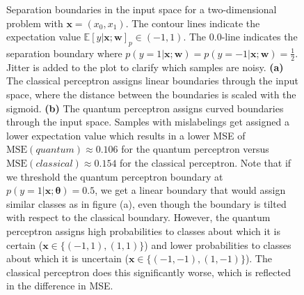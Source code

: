 \begin{figure}[htb!]
    \caption{Separation boundaries in the input space for a two-dimensional problem with $\mathbf{x}=(x_0, x_1)$. The contour lines indicate the expectation value $\mathbb{E}[y|\mathbf{x};\mathbf{w}]_p\in(-1,1)$. The $0.0$-line indicates the separation boundary where $p(y=1|\mathbf{x};\mathbf{w}) = p(y=-1|\mathbf{x};\mathbf{w})=\frac{1}{2}$. Jitter is added to the plot to clarify which samples are noisy. \textbf{(a)} The classical perceptron assigns linear boundaries through the input space, where the distance between the boundaries is scaled with the sigmoid. \textbf{(b)} The quantum perceptron assigns curved boundaries through the input space. Samples with mislabelings get assigned a lower expectation value which results in a lower MSE of $\text{MSE}(quantum) \approx 0.106$ for the quantum perceptron versus $\text{MSE}(classical) \approx 0.154$ for the classical perceptron. Note that if we threshold the quantum perceptron boundary at $p(y=1|\mathbf{x}; \bm{\theta}) = 0.5$, we get a linear boundary that would assign similar classes as in figure (a), even though the boundary is tilted with respect to the classical boundary. However, the quantum perceptron assigns high probabilities to classes about which it is certain ($\mathbf{x}\in \{(-1,1),(1,1)\}$) and lower probabilities to classes about which it is uncertain ($\mathbf{x}\in \{(-1,-1),(1,-1)\}$). The classical perceptron does this significantly worse, which is reflected in the difference in MSE.}
    \label{fig:boundaries_qm}
\end{figure}
